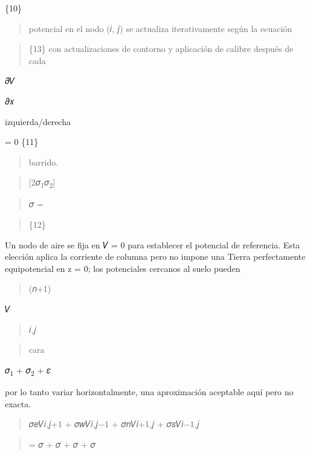 \documentclass[
]{article}
\begin{document}
\{10\}

\begin{quote}
potencial en el nodo (𝑖, 𝑗) se actualiza iterativamente según la
ecuación
\end{quote}

\begin{quote}
\{13\} con actualizaciones de contorno y aplicación de calibre después
de cada
\end{quote}

𝜕𝑉

𝜕𝑥

izquierda/derecha

= 0 \{11\}

\begin{quote}
barrido.
\end{quote}

\begin{quote}
{[}2𝜎\textsubscript{1}𝜎\textsubscript{2}{]}
\end{quote}

\begin{quote}
𝜎 =
\end{quote}

\begin{quote}
\{12\}
\end{quote}

Un nodo de aire se fija en 𝑉 = 0 para establecer el potencial de
referencia. Esta elección aplica la corriente de columna pero no impone
una Tierra perfectamente equipotencial en z = 0; los potenciales
cercanos al suelo pueden

\begin{quote}
(𝑛+1)
\end{quote}

𝑉

\begin{quote}
𝑖,𝑗
\end{quote}

\begin{quote}
cara
\end{quote}

𝜎\textsubscript{1} + 𝜎\textsubscript{2} + 𝜀

por lo tanto variar horizontalmente, una aproximación aceptable aquí
pero no exacta.

\begin{quote}
𝜎𝑒𝑉𝑖,𝑗+1 + 𝜎𝑤𝑉𝑖,𝑗−1 + 𝜎𝑛𝑉𝑖+1,𝑗 + 𝜎𝑠𝑉𝑖−1,𝑗
\end{quote}

\begin{quote}
= 𝜎 + 𝜎 + 𝜎 + 𝜎
\end{quote}
\end{document}
